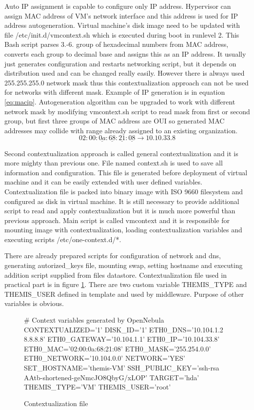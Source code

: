 Auto \Ac{IP} assignment is capable to configure only \Ac{IP} address. Hypervisor can assign \Ac{MAC} address of \Ac{VM}'s network interface and this address is used for \Ac{IP} address autogeneration. Virtual machine's disk image need to be updated with file /etc/init.d/vmcontext.sh which is executed during boot in runlevel 2. This \Ac{Bash} script parses 3.-6. group of hexadecimal numbers from \Ac{MAC} address, converts each group to decimal base and assigns this as an \Ac{IP} address. It usually just generates configuration and restarts networking script, but it depends on distribution used and can be changed really easily.
However there is always used 255.255.255.0 network mask thus this contextualization approach can not be used for networks with different mask. Example of \Ac{IP} generation is in equation \ref{eq:macip}. Autogeneration algorithm can be upgraded to work with different network mask by modifying vmcontext.sh script to read mask from first or second group, but first three groups of \Ac{MAC} address are \Ac{OUI} so generated \Ac{MAC} addresses may collide with range already assigned to an existing organization.
\begin{equation}
	\label{eq:macip}
	02:00:\underline{0a}:\underline{68}:\underline{21}:\underline{08} \rightarrow 10.10.33.8
\end{equation}

Second contextualization approach is called general contextualization and it is more mighty than previous one. File named context.sh is used to save all information and configuration. This file is generated before deployment of virtual machine and it can be easily extended with user defined variables.
Contextualization file is packed into binary image with ISO 9660 filesystem and configured as disk in virtual machine.
It is still necessary to provide additional script to read and apply contextualization but it is much more powerful than previous approach. Main script is called vmcontext and it is responsible for mounting image with contextualization, loading contextualization variables and executing scripts /etc/one-context.d/*. 

There are already prepared scripts for configuration of network and dns, generating autorized\_keys file, mounting swap, setting hostname and executing addition script supplied from files datastore. Contextualization file used in practical part is in figure \ref{code:contextualization}. There are two custom variable THEMIS\_TYPE and THEMIS\_USER defined in template and used by middleware. Purpose of other variables is obvious.

\begin{figure}[htb]
\caption{Contextualization file}
\label{code:contextualization}
\begin{verbatimtab}
# Context variables generated by OpenNebula
CONTEXTUALIZED='1'
DISK_ID='1'
ETH0_DNS='10.104.1.2 8.8.8.8'
ETH0_GATEWAY='10.104.1.1'
ETH0_IP='10.104.33.8'
ETH0_MAC='02:00:0a:68:21:08'
ETH0_MASK='255.254.0.0'
ETH0_NETWORK='10.104.0.0'
NETWORK='YES'
SET_HOSTNAME='themis-VM'
SSH_PUBLIC_KEY='ssh-rsa AAtb-shortened-geNmcJO8QbyG/xLOP'
TARGET='hda'
THEMIS_TYPE='VM'
THEMIS_USER='root'
\end{verbatimtab}
\end{figure}
